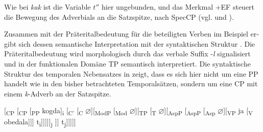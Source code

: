 \documentclass[output=paper, colorlinks, citecolor=brown, booklanguage=german]{langscibook}
\begin{document}
\begin{otherlanguage}{german}
\ea \label{ex:18:38}
	\z
\z

\noindent Wie bei \textit{kak} ist die Variable $t''$ hier ungebunden, und das Merkmal +EF steuert die Bewegung des Adverbials an die Satzspitze, nach SpecCP (vgl.  und ).

\largerpage
Zusammen mit der Präteritalbedeutung  für die beteiligten Verben im Bei\-spiel  ergibt sich dessen semantische Interpretation  mit der syn\-tak\-ti\-schen Struktur . Die Präteritalbedeutung wird morphologisch durch das verbale Suffix -\textit{l} signalisiert und in der funktionalen Domäne TP semantisch interpretiert. Die syntaktische Struktur des temporalen Nebensatzes in  zeigt, dass es sich hier nicht um eine PP handelt wie in den bisher betrachteten Temporalsätzen, sondern um eine CP mit einem \textit{k}-Adverb an der Satzspitze.

\ea \label{ex:18:39}
	\ea{ \label{ex:18:39a} $\varnothing$
    }
	\z
\z

\ea \label{ex:18:40} [\textsubscript{CP} [\textsubscript{CP} [\textsubscript{PP} kogda]\textsubscript{i} [\textsubscript{C'} [\textsubscript{C} $\varnothing$][\textsubscript{ModP} [\textsubscript{Mod} $\varnothing$][\textsubscript{TP} [\textsubscript{T} $\varnothing$][\textsubscript{AspP} [\textsubscript{AspP} [\textsubscript{Asp} $\varnothing$][\textsubscript{VP} ja [\textsubscript{V} obedala]]] t\textsubscript{i}]]]]]\textsubscript{j}
\newline
[\textsubscript{C'} [\textsubscript{C} $\varnothing$][\textsubscript{ModP} [\textsubscript{Mod} $\varnothing$][\textsubscript{TP} [\textsubscript{T} $\varnothing$][\textsubscript{AspP} [\textsubscript{AspP} [\textsubscript{Asp} $\varnothing$][\textsubscript{VP} Pëtr [\textsubscript{V} spal]]] t\textsubscript{j}]]]]]
\z


\end{otherlanguage}
\end{document}
